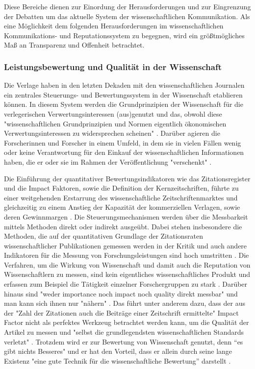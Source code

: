 Diese Bereiche dienen zur Einordung der Herausforderungen und zur Eingrenzung der Debatten um das aktuelle System der wissenschaftlichen Kommunikation. Als eine Möglichkeit dem folgenden Herausforderungen im wissenschaftlichen Kommunikations- und Reputationssystem zu begegnen, wird ein größtmögliches Maß an Transparenz und Offenheit betrachtet.

\subsubsection{Leistungsbewertung und Qualität in der Wissenschaft}

Die Verlage haben in den letzten Dekaden mit den wissenschaftlichen Journalen ein zentrales Steuerungs- und Bewertungssystem in der Wissenschaft etablieren können. In diesem System werden die Grundprinzipien der Wissenschaft für die verlegerischen Verwertungsinteressen (aus)genutzt und das, obwohl diese "wissenschaftlichen Grundprinzipien und Normen eigentlich ökonomischen Verwertungsinteressen zu widersprechen scheinen" \cite{hanekop_2006}. Darüber agieren die Forscherinnen und Forscher in einem Umfeld, in dem sie in vielen Fällen wenig oder keine Verantwortung für den Einkauf der wissenschaftlichen Informationen haben, die er oder sie im Rahmen der Veröffentlichung "verschenkt" \cite{steele_2006}.

Die Einführung der quantitativer Bewertungsindikatoren wie das Zitationsregister und die Impact Faktoren, sowie die Definition der Kernzeitschriften, führte zu einer weitgehenden Erstarrung des wissenschaftliche Zeitschriftenmarktes und gleichzeitig zu einem Anstieg der Kapazität der kommerziellen Verlagen, sowie deren Gewinnmargen \cite{CREATe_2014}. Die Steuerungsmechanismen werden über die Messbarkeit mittels Methoden direkt oder indirekt ausgeübt. Dabei stehen insbesondere die Methoden, die auf der quantitativen Grundlage der Zitationsraten wissenschaftlicher Publikationen gemessen werden in der Kritik \cite{Brembs_2013} \cite{Dong_2005} und auch andere Indikatoren für die Messung von Forschungsleistungen sind hoch umstritten \cite{Hornbostel_1997} \cite{Hicks_1996} \cite{Havemann_2002} \cite{Warnke_2012}. Die Verfahren, um die Wirkung von Wissenschaft und damit auch die Reputation von Wissenschaftlern zu messen, sind kein eigentliches wissenschaftliches Produkt \cite{suchen} und erfassen zum Beispiel die Tätigkeit einzelner Forschergruppen zu stark \cite{schmoch_2009}. Darüber hinaus sind "weder importance noch impact noch quality direkt messbar" und man kann sich ihnen nur "nähern" \cite{Hornbostel_1997}. Das führt unter anderem dazu, dass der aus der "Zahl der Zitationen auch die Beiträge einer Zeitschrift ermittelte" \cite{weishaupt_2009_goldenOA} Impact Factor nicht als perfektes Werkzeug betrachtet werden kann, um die Qualität der Artikel zu messen \cite{garfield_1999} und "selbst die grundlegendsten wissenschaftlichen Standards verletzt" \cite{Brembs_20013}. Trotzdem wird er zur Bewertung von Wissenschaft genutzt, denn “es gibt nichts Besseres" und er hat den Vorteil, dass er allein durch seine lange Existenz "eine gute Technik für die wissenschaftliche Bewertung” darstellt \cite{garfield_1999} \cite{weishaupt_2009_goldenOA}.

